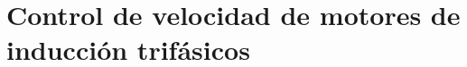 \documentclass[e4_tp2_main.tex]{subfiles}
\begin{document}

\section{Control de velocidad de motores de inducción trifásicos}
\end{document}
